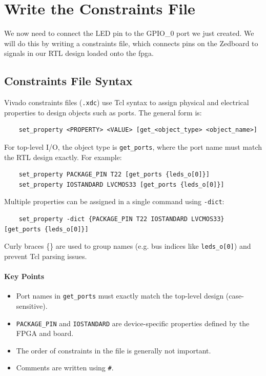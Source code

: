 \section{Write the Constraints File}

    We now need to connect the LED pin to the GPIO\_0 port we just created. We will do this by writing a constraints file, which connects pins on the Zedboard to signals in our RTL design loaded onto the \gls{fpga}.

    \subsection{Constraints File Syntax}

    Vivado constraints files (\texttt{.xdc}) use Tcl syntax to assign physical and electrical properties to design objects such as ports. The general form is:

    \begin{verbatim}
    set_property <PROPERTY> <VALUE> [get_<object_type> <object_name>]
    \end{verbatim}

    For top-level I/O, the object type is \texttt{get\_ports}, where the port name must match the RTL design exactly. For example:

    \begin{verbatim}
    set_property PACKAGE_PIN T22 [get_ports {leds_o[0]}]
    set_property IOSTANDARD LVCMOS33 [get_ports {leds_o[0]}]
    \end{verbatim}

    Multiple properties can be assigned in a single command using \texttt{-dict}:

    \begin{verbatim}
    set_property -dict {PACKAGE_PIN T22 IOSTANDARD LVCMOS33} [get_ports {leds_o[0]}]
    \end{verbatim}

    Curly braces \{\} are used to group names (e.g. bus indices like \texttt{leds\_o[0]}) and prevent Tcl parsing issues.

    \paragraph{Key Points}
    \begin{itemize}
        \item Port names in \texttt{get\_ports} must exactly match the top-level design (case-sensitive).
        \item \texttt{PACKAGE\_PIN} and \texttt{IOSTANDARD} are device-specific properties defined by the FPGA and board.
        \item The order of constraints in the file is generally not important.
        \item Comments are written using \texttt{\#}.
    \end{itemize}

